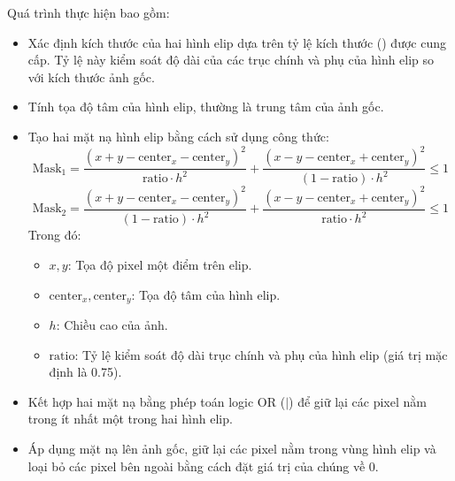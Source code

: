 Quá trình thực hiện bao gồm:
\begin{itemize}
	\item Xác định kích thước của hai hình elip dựa trên tỷ lệ kích thước () được cung cấp. Tỷ lệ này kiểm soát độ dài của các trục chính và phụ của hình elip so với kích thước ảnh gốc.
	\item Tính tọa độ tâm của hình elip, thường là trung tâm của ảnh gốc.
	\item Tạo hai mặt nạ hình elip bằng cách sử dụng công thức:
	      \[
		      \text{Mask}_1 = \frac{(x + y - \text{center}_x - \text{center}_y)^2}{\text{ratio} \cdot h^2} + \frac{(x - y - \text{center}_x + \text{center}_y)^2}{(1 - \text{ratio}) \cdot h^2} \leq 1
	      \]
	      \[
		      \text{Mask}_2 = \frac{(x + y - \text{center}_x - \text{center}_y)^2}{(1 - \text{ratio}) \cdot h^2} + \frac{(x - y - \text{center}_x + \text{center}_y)^2}{\text{ratio} \cdot h^2} \leq 1
	      \]
	      Trong đó:
	      \begin{itemize}
		      \item \(x, y\): Tọa độ pixel một điểm trên elip.
		      \item \(\text{center}_x, \text{center}_y\): Tọa độ tâm của hình elip.
		      \item \(h\): Chiều cao của ảnh.
		      \item \(\text{ratio}\): Tỷ lệ kiểm soát độ dài trục chính và phụ của hình elip (giá trị mặc định là 0.75).
	      \end{itemize}
	\item Kết hợp hai mặt nạ bằng phép toán logic OR (\(|\)) để giữ lại các pixel nằm trong ít nhất một trong hai hình elip.
	\item Áp dụng mặt nạ lên ảnh gốc, giữ lại các pixel nằm trong vùng hình elip và loại bỏ các pixel bên ngoài bằng cách đặt giá trị của chúng về 0.
\end{itemize}

